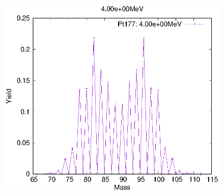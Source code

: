 \begin{figure}[htbp]
\begin{minipage}{0.33\textwidth} \begin{center} \includegraphics[width=\textwidth]{YA/Pt177_4.00e+00.eps} \end{center} \end{minipage}
\end{figure}
